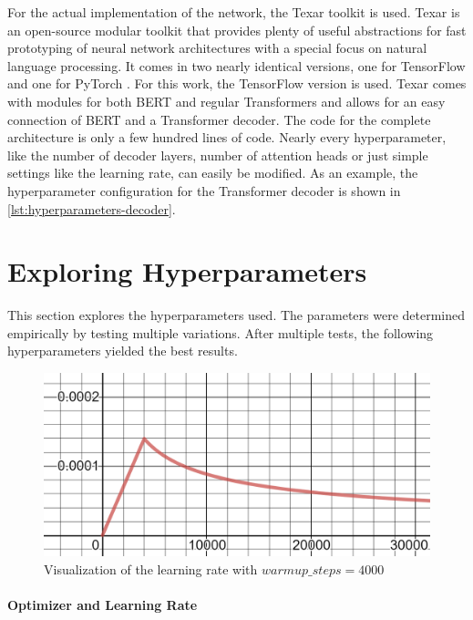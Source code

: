 For the actual implementation of the network, the Texar toolkit \cite{hu2019texar} is used.
Texar is an open-source modular toolkit that provides plenty of useful abstractions for fast prototyping of neural network architectures with a special focus on natural language processing.
It comes in two nearly identical versions, one for TensorFlow \cite{tensorflow2015-whitepaper} and one for PyTorch \cite{NEURIPS2019_9015}.  
For this work, the TensorFlow version is used.
Texar comes with modules for both BERT and regular Transformers and allows for an easy connection of BERT and a Transformer decoder.
The code for the complete architecture is only a few hundred lines of code.
Nearly every hyperparameter, like the number of decoder layers, number of attention heads or just simple settings like the learning rate, can easily be modified.
As an example, the hyperparameter configuration for the Transformer decoder is shown in \cref{lst:hyperparameters-decoder}.


\section{Exploring Hyperparameters}

This section explores the hyperparameters used.
The parameters were determined empirically by testing multiple variations.
After multiple tests, the following hyperparameters yielded the best results.

\begin{figure}[h]
\centering
\includegraphics[width=0.6\paperwidth]{figures/learning-rate}
\caption{Visualization of the learning rate with $warmup\_steps = 4000$}
\label{fig:learning-rate}
\end{figure}

\paragraph{Optimizer and Learning Rate}

